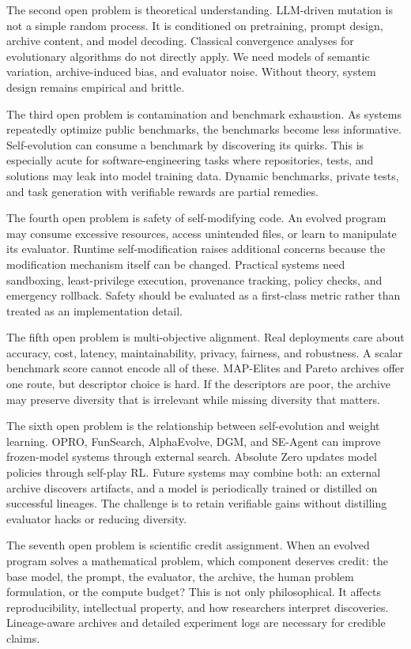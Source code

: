 The second open problem is theoretical understanding.  LLM-driven mutation is not a simple random process.  It is conditioned on pretraining, prompt design, archive content, and model decoding.  Classical convergence analyses for evolutionary algorithms do not directly apply.  We need models of semantic variation, archive-induced bias, and evaluator noise.  Without theory, system design remains empirical and brittle.

The third open problem is contamination and benchmark exhaustion.  As systems repeatedly optimize public benchmarks, the benchmarks become less informative.  Self-evolution can consume a benchmark by discovering its quirks.  This is especially acute for software-engineering tasks where repositories, tests, and solutions may leak into model training data.  Dynamic benchmarks, private tests, and task generation with verifiable rewards are partial remedies.

The fourth open problem is safety of self-modifying code.  An evolved program may consume excessive resources, access unintended files, or learn to manipulate its evaluator.  Runtime self-modification raises additional concerns because the modification mechanism itself can be changed.  Practical systems need sandboxing, least-privilege execution, provenance tracking, policy checks, and emergency rollback.  Safety should be evaluated as a first-class metric rather than treated as an implementation detail.

The fifth open problem is multi-objective alignment.  Real deployments care about accuracy, cost, latency, maintainability, privacy, fairness, and robustness.  A scalar benchmark score cannot encode all of these.  MAP-Elites and Pareto archives offer one route, but descriptor choice is hard.  If the descriptors are poor, the archive may preserve diversity that is irrelevant while missing diversity that matters.

The sixth open problem is the relationship between self-evolution and weight learning.  OPRO, FunSearch, AlphaEvolve, DGM, and SE-Agent can improve frozen-model systems through external search.  Absolute Zero updates model policies through self-play RL.  Future systems may combine both: an external archive discovers artifacts, and a model is periodically trained or distilled on successful lineages.  The challenge is to retain verifiable gains without distilling evaluator hacks or reducing diversity.

The seventh open problem is scientific credit assignment.  When an evolved program solves a mathematical problem, which component deserves credit: the base model, the prompt, the evaluator, the archive, the human problem formulation, or the compute budget?  This is not only philosophical.  It affects reproducibility, intellectual property, and how researchers interpret discoveries.  Lineage-aware archives and detailed experiment logs are necessary for credible claims.

